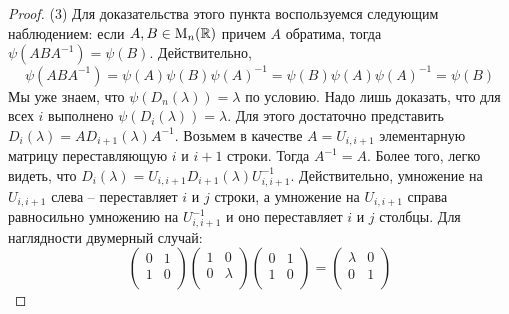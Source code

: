 \begin{proof}
(3) Для доказательства этого пункта воспользуемся следующим наблюдением: если $A,B\in\operatorname{M}_{n}(\mathbb R)$ причем $A$ обратима, тогда $\psi(ABA^{-1}) = \psi(B)$.
Действительно, 
\[
\psi(ABA^{-1}) = \psi(A)\psi(B)\psi(A)^{-1} =  \psi(B)\psi(A)\psi(A)^{-1} = \psi(B)
\]
Мы уже знаем, что $\psi(D_n(\lambda)) = \lambda$ по условию.
Надо лишь доказать, что для всех $i$ выполнено $\psi(D_i(\lambda)) = \lambda$.
Для этого достаточно представить $D_{i}(\lambda) = A D_{i+1}(\lambda)A^{-1}$.
Возьмем в качестве $A = U_{i, i+1}$ элементарную матрицу переставляющую $i$ и $i+1$ строки.
Тогда $A^{-1} = A$.
Более того, легко видеть, что $D_{i}(\lambda) = U_{i, i+1} D_{i+1}(\lambda)U_{i, i+1}^{-1}$.
Действительно, умножение на $U_{i, i+1}$ слева -- переставляет $i$ и $j$ строки, а умножение на $U_{i, i+1}$ справа равносильно умножению на $U_{i, i+1}^{-1}$ и оно переставляет $i$ и $j$ столбцы.
Для наглядности двумерный случай:
\[
\begin{pmatrix}
{0}&{1}\\
{1}&{0}\\
\end{pmatrix}
\begin{pmatrix}
{1}&{0}\\
{0}&{\lambda}\\
\end{pmatrix}
\begin{pmatrix}
{0}&{1}\\
{1}&{0}\\
\end{pmatrix}
=
\begin{pmatrix}
{\lambda}&{0}\\
{0}&{1}\\
\end{pmatrix}
\]


\end{proof}
